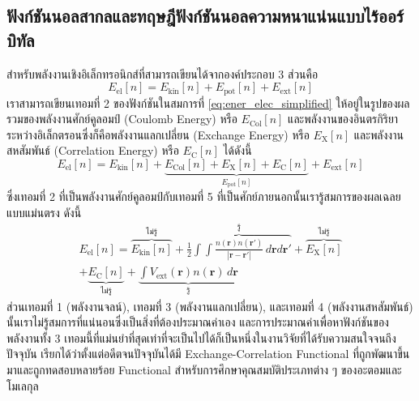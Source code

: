 \subsection{ฟังก์ชันนอลสากลและทฤษฎีฟังก์ชันนอลความหนาแน่นแบบไร้ออร์บิทัล}
\label{ssec:univer_functional}

สำหรับพลังงานเชิงอิเล็กทรอนิกส์ที่สามารถเขียนได้จากองค์ประกอบ 3 ส่วนคือ
%
\begin{equation}\label{eq:ener_elec_simplified}
    E_{\text{el}}[n] = E_{\text{kin}}[n] + E_{\text{pot}}[n] + E_{\text{ext}}[n]
\end{equation}
%
\noindent เราสามารถเขียนเทอมที่ 2 ของฟังก์ชันในสมการที่ \eqref{eq:ener_elec_simplified} ให้อยู่ในรูปของผลรวมของพลังงานศักย์คูลอมป์ (Coulomb Energy) หรือ $E_{\text{Col}}[n]$ และพลังงานของอินตรกิริยาระหว่างอิเล็กตรอนซึ่งก็คือพลังงานแลกเปลี่ยน (Exchange Energy) หรือ $E_{\text{X}}[n]$ และพลังงานสหสัมพันธ์ (Correlation Energy) หรือ $E_{\text{C}}[n]$ ได้ดังนี้
%
\begin{equation}\label{eq:ener_elec_full}
    E_{\text{el}}[n] = E_{\text{kin}}[n] + \underbrace{E_{\text{Col}}[n] + E_{\text{X}}[n] + E_{\text{C}}[n]}    _{\textstyle E_{\text{pot}}[n]} + E_{\text{ext}}[n]
\end{equation}
%
\noindent ซึ่งเทอมที่ 2 ที่เป็นพลังงานศักย์คูลอมป์กับเทอมที่ 5 ที่เป็นศักย์ภายนอกนั้นเรารู้สมการของผลเฉลยแบบแม่นตรง ดังนี้
%
\begin{multline}\label{eq:ener_elec_full_exact}
    E_{\text{el}}[n] = \overbrace{E_{\text{kin}}[n]}^{\textstyle \text{ไม่รู้}}
    + \overbrace{\frac{1}{2} \int \int \frac{n(\bm{r})n(\bm{r'})}{|\bm{r}-\bm{r'}|} \, d\bm{r} d\bm{r'}}^{        \textstyle \text{รู้}} + \overbrace{E_{\text{X}}[n]}^{\textstyle \text{ไม่รู้}} \\
    + \underbrace{E_{\text{C}}[n]}_{\textstyle \text{ไม่รู้}}
    + \underbrace{\int V_{\text{ext}}(\bm{r}) n(\bm{r}) \, d\bm{r}}_{\textstyle \text{รู้}}
\end{multline}
%
\noindent ส่วนเทอมที่ 1 (พลังงานจลน์), เทอมที่ 3 (พลังงานแลกเปลี่ยน), และเทอมที่ 4 (พลังงานสหสัมพันธ์) นั้นเราไม่รู้สมการที่แน่นอนซึ่งเป็นสิ่งที่ต้องประมาณค่าเอง และการประมาณค่าเพื่อหาฟังก์ชันของพลังงานทั้ง 3 เทอมนี้ที่แม่นยำที่สุดเท่าที่จะเป็นไปได้ก็เป็นหนึ่งในงานวิจัยที่ได้รับความสนใจจนถึงปัจจุบัน\autocite{peverati2014} เรียกได้ว่าตั้งแต่อดีตจนปัจจุบันได้มี Exchange-Correlation Functional ที่ถูกพัฒนาขึ้นมาและถูกทดสอบหลายร้อย Functional\autocite{ernzerhof1999,dev2012,peverati2012,zhang2013,kanungo2019} สำหรับการศึกษาคุณสมบัติประเภทต่าง ๆ ของอะตอมและโมเลกุล\autocite{han2018,sharma2018,borlido2019,fabiano2019,cardeynaels2020,deoliveira2021,moldabekov2022}

